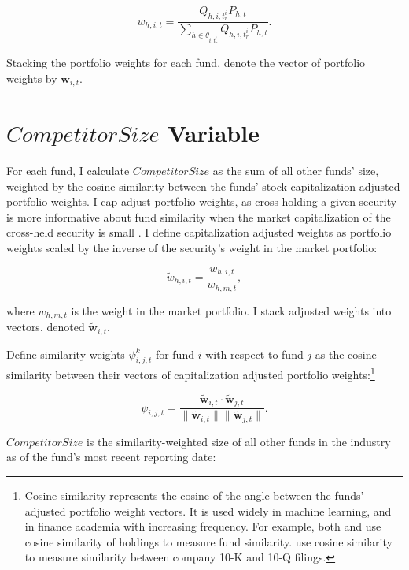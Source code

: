 \documentclass[openany]{book}
\let\rmarkdownfootnote\footnote%
\def\footnote{\protect\rmarkdownfootnote}
\theoremstyle{definition}
\theoremstyle{definition}
\theoremstyle{definition}
\theoremstyle{remark}
\begin{document}
\begin{equation}
w_{h,i,t} = \frac{Q_{h,i,t^i_r} P_{h,t} }{\sum_{h\in\theta_{i,t^i_r}} Q_{h,i,t^i_r} P_{h,t} }.
\end{equation}

Stacking the portfolio weights for each fund, denote the vector of
portfolio weights by \(\mathbf{w}_{i,t}\).

\section{\texorpdfstring{\(CompetitorSize\)
Variable}{CompetitorSize Variable}}\label{sec:CompetitorSize}

For each fund, I calculate \(CompetitorSize\) as the sum of all other
funds' size, weighted by the cosine similarity between the funds' stock
capitalization adjusted portfolio weights. I cap adjust portfolio
weights, as cross-holding a given security is more informative about
fund similarity when the market capitalization of the cross-held
security is small \citep{ccp05}. I define capitalization adjusted
weights as portfolio weights scaled by the inverse of the security's
weight in the market portfolio:

\begin{equation}
\tilde{w}_{h,i,t} = \frac{w_{h,i,t}}{w_{h,m,t}},
\end{equation}

where \(w_{h,m,t}\) is the weight in the market portfolio. I stack
adjusted weights into vectors, denoted \(\mathbf{\tilde{w}}_{i,t}\).

Define similarity weights \(\psi_{i,j,t}^k\) for fund \(i\) with respect
to fund \(j\) as the cosine similarity between their vectors of
capitalization adjusted portfolio weights:\footnote{Cosine similarity
  represents the cosine of the angle between the funds' adjusted
  portfolio weight vectors. It is used widely in machine learning, and
  in finance academia with increasing frequency. For example, both
  \citet{blocher16} and \citet{hkp17} use cosine similarity of holdings
  to measure fund similarity. \citet{lmn16} use cosine similarity to
  measure similarity between company 10-K and 10-Q filings.}

\begin{equation}
\psi_{i,j,t} = \frac{ \mathbf{\tilde{w}}_{i,t} \cdot \mathbf{\tilde{w}}_{j,t} }{ \| \mathbf{\tilde{w}}_{i,t} \|  \| \mathbf{\tilde{w}}_{j,t} \| }.
\end{equation}

\(CompetitorSize\) is the similarity-weighted size of all other funds in
the industry as of the fund's most recent reporting date:
\end{document}

